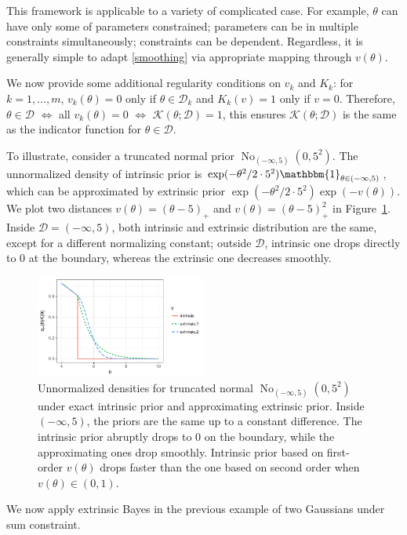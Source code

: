 \documentclass[10pt]{article}
\newcommand{\mc}[1]{\mathcal{#1}}
\DeclareMathOperator{\No}{No}
\DeclareMathOperator{\1}{\mathbbm{1}}
\begin{document}
This framework is applicable to a variety of complicated case. For example, $\theta$ can have only some of parameters constrained; parameters can be in multiple constraints simultaneously; constraints can be dependent. Regardless, it is generally simple to adapt \eqref{smoothing} via appropriate mapping through $v(\theta)$. 

We now provide some additional regularity conditions on $v_k$ and $K_k$: for $k=1,\ldots,m$, $v_k(\theta)=0$ only if $\theta\in \mc D_k$ and $K_k(v)=1$ only if $v=0$. Therefore, $\theta\in \mc D$ $\Leftrightarrow$ all $v_k(\theta)=0$ $\Leftrightarrow$ $\mc K(\theta; \mc D)=1$, this ensures $\mc K(\theta; \mc D)$ is the same as the indicator function for $\theta\in \mc D$.

To illustrate, consider a truncated normal prior $\No_{(-\infty,5)}(0,5^2)$. The unnormalized density of intrinsic prior is $\exp(-{\theta^2}/{2\cdot 5^2})\mathbbm{1}_{\theta\in (-\infty,5)}$, which can be approximated by  extrinsic prior $\exp(-{\theta^2}/{2\cdot 5^2}) \exp(-v(\theta))$. We plot two distances $v(\theta)=(\theta-5)_+$ and $v(\theta)=(\theta-5)^2_+$ in Figure~\ref{truncated_normal}. Inside $\mc D=(-\infty,5)$, both intrinsic and extrinsic distribution are the same, except for a different normalizing constant; outside $\mc D$, intrinsic one drops directly to $0$ at the boundary, whereas the extrinsic one decreases smoothly.

\begin{figure}[H]
 \centering
 \includegraphics[width=0.5\textwidth]{density_truncated_normal}
\caption{Unnormalized densities for truncated normal $\No_{(-\infty,5)}(0,5^2)$ under exact intrinsic prior and approximating extrinsic prior. Inside $(-\infty,5)$, the priors are the same up to a constant difference. The intrinsic prior abruptly drops to $0$ on the boundary, while the approximating ones drop smoothly. Intrinsic prior based on first-order $v(\theta)$ drops faster than the one based on second order when $v(\theta)\in (0,1)$.}
\label{truncated_normal}
\end{figure}

We now apply extrinsic Bayes in the previous example of two Gaussians under sum constraint.
\end{document}
